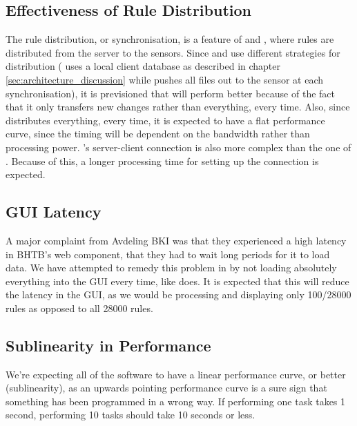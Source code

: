 \subsection{Effectiveness of Rule Distribution}
The rule distribution, or synchronisation, is a feature of \snowman{} and
\bhtb{}, where rules are distributed from the server to the sensors. Since
\snowman{} and \bhtb{} use different strategies for distribution (\snowman{}
uses a local client database as described in chapter
\ref{sec:architecture_discussion} while \bhtb{} pushes all files out to the
sensor at each synchronisation), it is previsioned that \snowman{} will perform
better because of the fact that it only transfers new changes rather than
everything, every time. Also, since \bhtb{} distributes everything, every time,
it is expected to have a flat performance curve, since the timing will
be dependent on the bandwidth rather than processing power. \snowman{}'s
server-client connection is also more complex than the one of \bhtb{}. Because
of this, a longer processing time for setting up the connection is expected.

\subsection{GUI Latency}
A major complaint from Avdeling BKI was that they experienced a high latency in
BHTB's web component, that they had to wait long periods for it to load data.
We have attempted to remedy this problem in \snowman{} by not loading absolutely
everything into the GUI every time, like \bhtb{} does. It is expected that this
will reduce the latency in the GUI, as we would be processing and displaying
only 100/28000 rules as opposed to all 28000 rules.

\subsection{Sublinearity in Performance}
We're expecting all of the software to have a linear performance curve, or
better (sublinearity), as an upwards pointing performance curve is a sure
sign that something has been programmed in a wrong way. If performing one task
takes 1 second, performing 10 tasks should take 10 seconds or less. 
